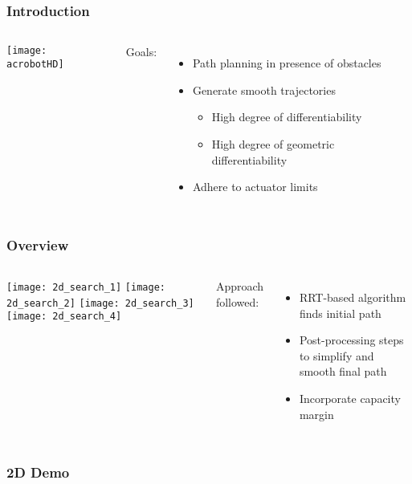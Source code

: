 \begin{frame}
	\frametitle{Introduction}

	\begin{columns}
			\begin{center}
				\texttt{[image: acrobotHD]}
			\end{center}


			Goals:

			\begin{itemize}

				\item
					Path planning in presence of obstacles

				\item
					Generate smooth trajectories

					\begin{itemize}
						\item High degree of differentiability
						\item High degree of geometric differentiability
					\end{itemize}

				\item
					Adhere to actuator limits

			\end{itemize}
	\end{columns}
\end{frame}

\begin{frame}
	\frametitle{Overview}

	\begin{columns}
		\column{0.65\textwidth}
			\begin{minipage}{\textwidth}
				\texttt{[image: 2d\_search\_1]}%
				\texttt{[image: 2d\_search\_2]}
				\texttt{[image: 2d\_search\_3]}%
				\texttt{[image: 2d\_search\_4]}
			\end{minipage}

		\column{0.35\textwidth}

			Approach followed:

			\begin{itemize}

				\item

					RRT-based algorithm finds initial path

				\item

					Post-processing steps to simplify and smooth final path

				\item

					Incorporate capacity margin

			\end{itemize}

	\end{columns}

\end{frame}

\begin{frame}
	\frametitle{2D Demo}

\end{frame}
